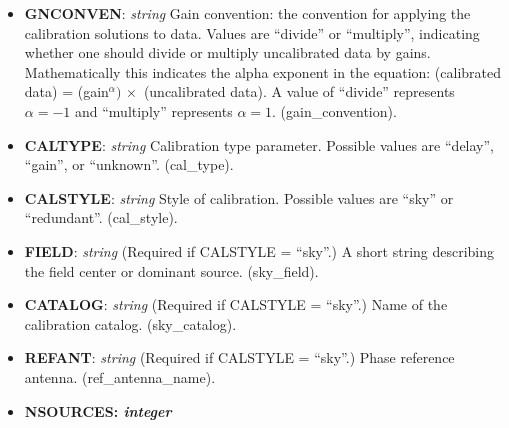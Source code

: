 \documentclass[11pt, oneside, english]{article}   	%
\begin{document}
\begin{itemize}
\item{\textbf{GNCONVEN}: \emph{string} Gain convention: the convention for applying the calibration solutions to data.
Values are ``divide'' or ``multiply'', indicating whether one should divide or multiply uncalibrated data by gains. 
Mathematically this indicates the alpha exponent in the equation: 
    (calibrated data) = (gain$^{\alpha}) \,  \times $ (uncalibrated data). A value of
    ``divide'' represents $\alpha=-1$ and ``multiply'' represents $\alpha=1$. (gain\_convention).}
\item{\textbf{CALTYPE}: \emph{string} Calibration type parameter. Possible values are ``delay'', ``gain'', or ``unknown''. (cal\_type).}
\item{\textbf{CALSTYLE}: \emph{string} Style of calibration. Possible values are ``sky'' or ``redundant''. (cal\_style).}
\item{\textbf{FIELD}: \emph{string} (Required if CALSTYLE = ``sky''.) A short string describing the field center or dominant source. (sky\_field).}
\item{\textbf{CATALOG}: \emph{string} (Required if CALSTYLE = ``sky''.) Name of the calibration catalog. (sky\_catalog).}
\item{\textbf{REFANT}: \emph{string} (Required if CALSTYLE = ``sky''.) Phase reference antenna. (ref\_antenna\_name).}
\item{\textbf{NSOURCES: \emph{integer}}}



\end{itemize}
\end{document}
